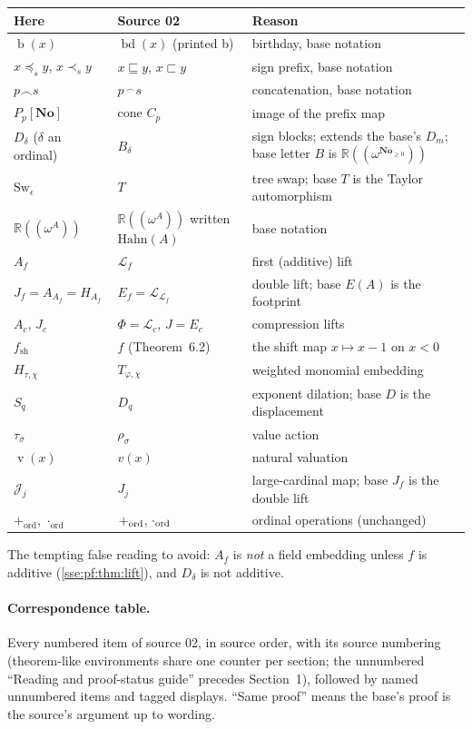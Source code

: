 \documentclass[11pt,a4paper]{article}
\numberwithin{equation}{section}
\theoremstyle{plain}
\theoremstyle{definition}
\theoremstyle{remark}
\newcommand{\No}{\mathbf{No}}
\newcommand{\R}{\mathbb{R}}
\newcommand{\bday}{\operatorname{b}}
\newcommand{\NF}[1]{\R((\omega^{#1}))}
\newcommand{\pref}{\preccurlyeq_s}
\newcommand{\spref}{\prec_s}
\newcommand{\concat}{\mathbin{\frown}}
\newcommand{\val}{\operatorname{v}}
\newcommand{\ordaddpf}{\mathbin{+_{\mathrm{ord}}}}
\newcommand{\ordmulpf}{\mathbin{\cdot_{\mathrm{ord}}}}
\newcommand{\Swpf}{\mathrm{Sw}}
\begin{document}
\begin{longtable}{P{40mm}P{40mm}P{68mm}}
\toprule
Here & Source 02 & Reason \\
\midrule
\endhead
$\bday(x)$ & $\operatorname{bd}(x)$ (printed b) & birthday, base notation \\
$x\pref y$, $x\spref y$ & $x\sqsubseteq y$, $x\sqsubset y$ & sign prefix, base notation \\
$p\concat s$ & $p\,{}^\frown s$ & concatenation, base notation \\
$P_p[\No]$ & cone $C_p$ & image of the prefix map \\
$D_\delta$ ($\delta$ an ordinal) & $B_\delta$ & sign blocks; extends the base's $D_m$; base letter $B$ is $\NF{\No_{\ge0}}$ \\
$\Swpf_\epsilon$ & $T$ & tree swap; base $T$ is the Taylor automorphism \\
$\NF{A}$ & $\R((\omega^{A}))$ written $\mathrm{Hahn}(A)$ & base notation \\
$A_f$ & $\mathcal L_f$ & first (additive) lift \\
$J_f=A_{A_f}=H_{A_f}$ & $E_f=\mathcal L_{\mathcal L_f}$ & double lift; base $E(A)$ is the footprint \\
$A_c$, $J_c$ & $\Phi=\mathcal L_c$, $J=E_c$ & compression lifts \\
$f_{\mathrm{sh}}$ & $f$ (Theorem~6.2) & the shift map $x\mapsto x-1$ on $x<0$ \\
$H_{\tau,\chi}$ & $T_{\varphi,\chi}$ & weighted monomial embedding \\
$S_q$ & $D_q$ & exponent dilation; base $D$ is the displacement \\
$\tau_\sigma$ & $\rho_\sigma$ & value action \\
$\val(x)$ & $v(x)$ & natural valuation \\
$\mathcal J_j$ & $J_j$ & large-cardinal map; base $J_f$ is the double lift \\
$\ordaddpf$, $\ordmulpf$ & $+_{\rm ord}$, $\cdot_{\rm ord}$ & ordinal operations (unchanged) \\
\bottomrule
\end{longtable}
The tempting false reading to avoid: $A_f$ is \emph{not} a field embedding
unless $f$ is additive (\cref{sse:pf:thm:lift}), and $D_\delta$ is not
additive.

\paragraph{Correspondence table.} Every numbered item of source 02, in
source order, with its source numbering (theorem-like environments share
one counter per section; the unnumbered ``Reading and proof-status guide''
precedes Section~1), followed by named unnumbered items and tagged
displays. ``Same proof'' means the base's proof is the source's argument up
to wording.
\end{document}
